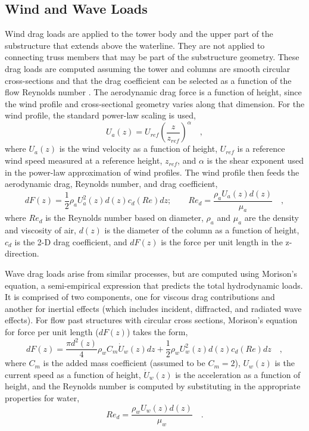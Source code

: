 \subsection{Wind and Wave Loads}
Wind drag loads are applied to the tower body and the upper part of the
substructure that extends above the waterline.  They are not applied to
connecting truss members that may be part of the substructure geometry.
These drag loads are computed assuming the tower and columns are smooth
circular cross-sections and that the drag coefficient can be selected as
a function of the flow Reynolds number \citep{Roshko}.  The aerodynamic
drag force is a function of height, since the wind profile and
cross-sectional geometry varies along that dimension.  For the wind
profile, the standard power-law scaling is used,
\begin{equation}
  U_a(z) = U_{ref}\left(\frac{z}{z_{ref}}\right)^{\alpha}\quad,
\end{equation}
where $U_a(z)$ is the wind velocity as a function of height, $U_{ref}$ is a
reference wind speed measured at a reference height, $z_{ref}$, and
$\alpha$ is the shear exponent used in the power-law approximation of
wind profiles.  The wind profile then feeds the aerodynamic drag,
Reynolds number, and drag coefficient,
\begin{equation} \label{eqn:drag}
  dF(z) = \frac{1}{2} \rho_a U_a^2(z) d(z) c_d(Re) dz;\qquad
  Re_d = \frac{\rho_a U_a(z) d(z)}{\mu_a}\quad,
\end{equation}
where $Re_d$ is the Reynolds number based on diameter, $\rho_a$ and
$\mu_a$ are the density and viscosity of air, $d(z)$ is the diameter of
the column as a function of height, $c_d$ is the 2-D drag coefficient, and
$dF(z)$ is the force per unit length in the z-direction.

Wave drag loads arise from similar processes, but are computed using
Morison's equation, a semi-empirical expression that predicts the total
hydrodynamic loads.  It is comprised of two components, one for viscous
drag contributions and another for inertial effects (which includes
incident, diffracted, and radiated wave effects).  For flow past
structures with circular cross sections, Morison's equation for force
per unit length ($dF(z)$) takes the form,
\begin{equation} \label{eqn:morison}
  dF(z) = \frac{\pi d^2(z)}{4} \rho_w C_m \dot{U}_w(z)dz + \frac{1}{2} \rho_w U_w^2(z) d(z) c_d(Re)dz\quad,
\end{equation}
where $C_m$ is the added mass coefficient (assumed to be $C_m=2$),
$U_w(z)$ is the current speed as a function of height, $\dot{U}_w(z)$ is
the acceleration as a function of height, and the Reynolds number is
computed by substituting in the appropriate properties for water,
\begin{equation}
Re_d = \frac{\rho_w U_w(z) d(z)}{\mu_w}\quad.
\end{equation}

